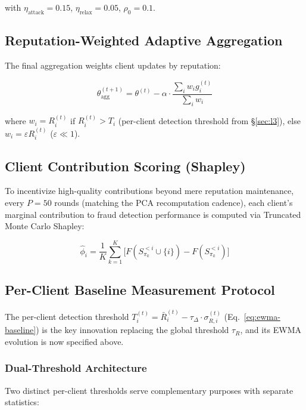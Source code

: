 \documentclass[10pt,journal]{IEEEtran}
\begin{document}
with $\eta_{\text{attack}} = 0.15$, $\eta_{\text{relax}} = 0.05$, $\rho_0 = 0.1$.

\subsection{Reputation-Weighted Adaptive Aggregation}

The final aggregation weights client updates by reputation:

\begin{equation}
\theta_{\text{agg}}^{(t+1)} = \theta^{(t)} - \alpha \cdot \frac{\sum_i w_i g_i^{(t)}}{\sum_i w_i}
\end{equation}

where $w_i = R_i^{(t)}$ if $R_i^{(t)} > T_i$ (per-client detection threshold from \S\ref{sec:l3}), else $w_i = \varepsilon R_i^{(t)}$ ($\varepsilon \ll 1$).

\subsection{Client Contribution Scoring (Shapley)}\label{sec:shapley}

To incentivize high-quality contributions beyond mere reputation maintenance, every $P=50$ rounds (matching the PCA recomputation cadence), each client's marginal contribution to fraud detection performance is computed via Truncated Monte Carlo Shapley:

\begin{equation}
\hat{\phi}_i = \frac{1}{K} \sum_{k=1}^{K} \bigl[ F(S_{\pi_k}^{<i} \cup \{i\}) - F(S_{\pi_k}^{<i}) \bigr]
\label{eq:shapley}
\end{equation}

\subsection{Per-Client Baseline Measurement Protocol}\label{sec:baseline}

The per-client detection threshold $T_i^{(t)} = \bar{R}_i^{(t)} - \tau_\Delta \cdot \sigma_{R,i}^{(t)}$ (Eq.~\ref{eq:ewma-baseline}) is the key innovation replacing the global threshold $\tau_R$, and its EWMA evolution is now specified above.

\subsubsection{Dual-Threshold Architecture}

Two distinct per-client thresholds serve complementary purposes with separate statistics:
\end{document}
